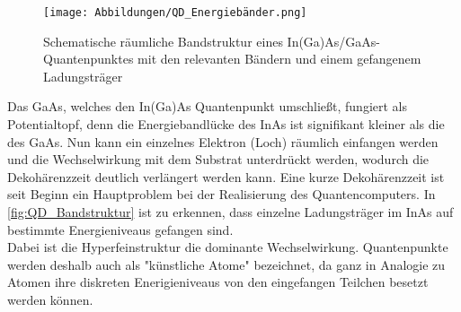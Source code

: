 \begin{figure}
   \centering
    \texttt{[image: Abbildungen/QD\_Energiebänder.png]}
    \caption{Schematische räumliche Bandstruktur eines In(Ga)As/GaAs-Quantenpunktes mit den relevanten Bändern und einem 
    gefangenem Ladungsträger}
    \label{fig:QD_Bandstruktur}
\end{figure}
\noindent Das GaAs, welches den In(Ga)As Quantenpunkt umschließt, fungiert als Potentialtopf, denn die Energiebandlücke des InAs ist 
signifikant kleiner als die des GaAs. Nun kann ein einzelnes Elektron (Loch) räumlich einfangen werden und die Wechselwirkung mit dem 
Substrat unterdrückt werden, wodurch die Dekohärenzzeit deutlich verlängert werden kann. Eine kurze Dekohärenzzeit ist seit Beginn ein 
Hauptproblem bei der Realisierung des Quantencomputers. In \autoref{fig:QD_Bandstruktur} ist zu erkennen, dass einzelne Ladungsträger 
im InAs auf bestimmte Energieniveaus gefangen sind.\\
Dabei ist die Hyperfeinstruktur die dominante Wechselwirkung. Quantenpunkte werden deshalb auch als "künstliche Atome" bezeichnet,
 da ganz in Analogie zu Atomen ihre diskreten Enerigieniveaus von den eingefangen Teilchen besetzt werden können.
